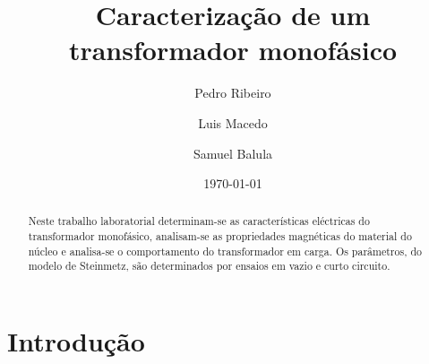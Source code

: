 \documentclass[%
  reprint,
  nofootinbib,
  amsmath,amssymb,
  aps,
  10pt,
]{revtex4-1}
\begin{document}


 

\title{Caracterização de um transformador monofásico}

\author{Pedro Ribeiro}%
\author{Luis Macedo}%
\author{Samuel Balula}%



\date{\today}

\begin{abstract}
Neste trabalho laboratorial determinam-se as características eléctricas do transformador monofásico, analisam-se as propriedades magnéticas do material do núcleo e analisa-se o comportamento do transformador em carga. Os parâmetros, do modelo de Steinmetz, são determinados por ensaios em vazio e curto circuito.
\end{abstract}
\maketitle


\section{Introdução}
\label{s:intro}
\end{document}
